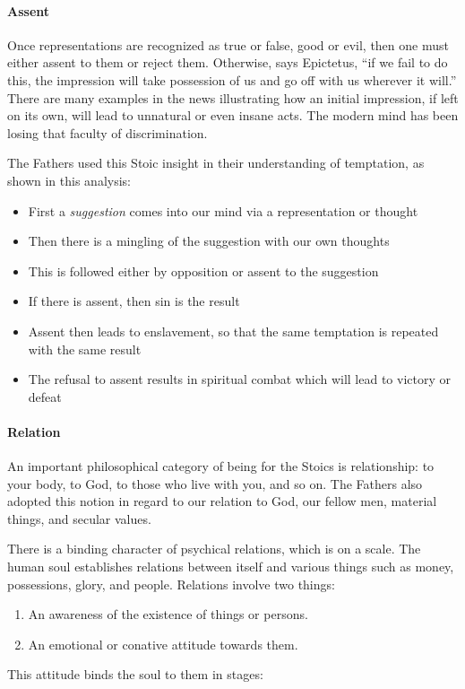 \paragraph{Assent}
Once representations are recognized as true or false, good or evil, then one must either assent to them or reject them.
Otherwise, says Epictetus, “if we fail to do this, the impression will take possession of us and go off with us
wherever it will.” There are many examples in the news illustrating how an initial impression, if left on its own, will
lead to unnatural or even insane acts. The modern mind has been losing that faculty of discrimination.

The Fathers used this Stoic insight in their understanding of temptation, as shown in this analysis:

\begin{itemize}
\item First a \emph{suggestion} comes into our mind via a representation or thought 
\item Then there is a mingling of the suggestion with our own thoughts 
\item This is followed either by opposition or assent to the suggestion 
\item If there is assent, then sin is the result 
\item Assent then leads to enslavement, so that the same temptation is repeated with the same result 
\item The refusal to assent results in spiritual combat which will lead to victory or defeat 
\end{itemize}

\paragraph{Relation}
An important philosophical category of being for the Stoics is relationship: to your body, to God, to those who live
with you, and so on. The Fathers also adopted this notion in regard to our relation to God, our fellow men, material
things, and secular values.

There is a binding character of psychical relations, which is on a scale. The human soul establishes relations between
itself and various things such as money, possessions, glory, and people. Relations involve two things:

\begin{enumerate}
\item An awareness of the existence of things or persons. 
\item An emotional or conative attitude towards them. 
\end{enumerate}
This attitude binds the soul to them in stages:

